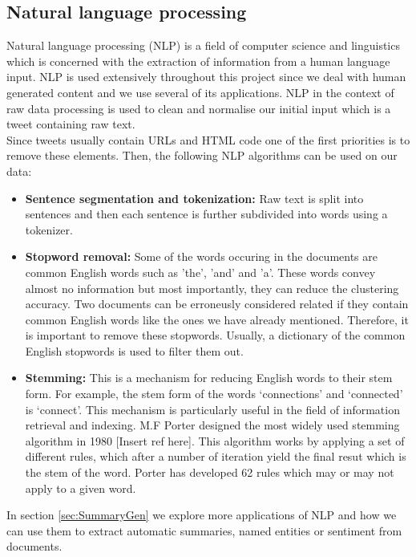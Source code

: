 \subsection{Natural language processing}

Natural language processing (NLP) is a field of computer science and linguistics which is concerned with the extraction of information from a human language 
input. NLP is used extensively throughout this project since we deal with human generated content and we use several of its applications. NLP in the context 
of raw data processing is used to clean and normalise our initial input which is a tweet containing raw text.\\ 
Since tweets usually contain URLs and HTML code one of the first priorities is to remove these elements. Then, the following NLP algorithms
can be used on our data:

\begin{itemize}
 \item \textbf{Sentence segmentation and tokenization:} Raw text is split into sentences and then each sentence is further subdivided into words using a tokenizer. 
 \item \textbf{Stopword removal:} Some of the words occuring in the documents are common English words such as 'the', 'and' and 'a'. These words convey almost no information 
 but most importantly, they can reduce the clustering accuracy. Two documents can be erroneusly considered related if they contain common English words like the ones
  we have already mentioned. Therefore, it is important to remove these stopwords. Usually, a dictionary of the common English stopwords is used to filter them out.   
 \item \textbf{Stemming:} This is a mechanism for reducing English words to their stem form. For example, the stem form of the words `connections' and `connected' is `connect'. This mechanism is particularly useful in the field of information retrieval and indexing. M.F Porter designed the most widely used stemming algorithm in 1980 [Insert ref here]. This algorithm works by applying a set of different rules, which after a number of iteration yield the final resut which is the stem of the word. Porter
has developed 62 rules which may or may not apply to a given word.
\end{itemize}\vspace{15pt}

In section \ref{sec:SummaryGen} we explore more applications of NLP and how we can use them to extract automatic summaries, named entities or sentiment from documents.

